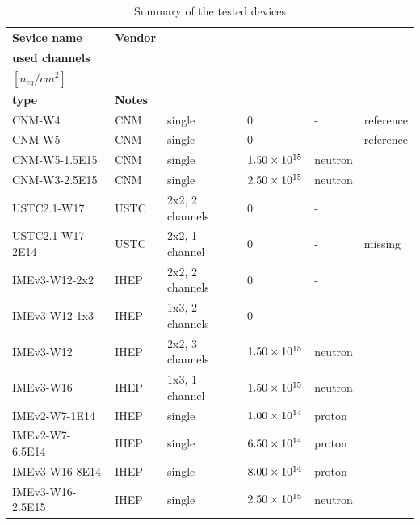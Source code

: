 \begin{table}[!ht]
    \centering
    \caption{Summary of the tested devices}
    \label{tab:devices_tested}
    \scriptsize
    \begin{tabularx}{1\textwidth}{|l|l|l|l|l|X|}
    \hline %
        \textbf{Sevice name} & \textbf{Vendor} & \begin{tabular}{@{}l@{}}\textbf{Pads,} \\ \textbf{used channels}\end{tabular} & \begin{tabular}{@{}l@{}}\textbf{Fluence} \\ $[n_{eq}/\si{cm^2}]$ \end{tabular} & \begin{tabular}{@{}l@{}} \textbf{Radiation} \\ \textbf{type} \end{tabular} & \textbf{Notes} \\
        \hline
        CNM-W4  & CNM & single & 0 & - & reference \\ 
        CNM-W5  & CNM & single & 0 & - & reference \\ 
        CNM-W5-1.5E15  & CNM & single & $\num{1.50E+15}$ & neutron &  \\ 
        CNM-W3-2.5E15  & CNM & single & $\num{2.50E+15}$ & neutron &  \\ 
        USTC2.1-W17 & USTC & 2x2, 2 channels  & 0 & - &  \\ 
        USTC2.1-W17-2E14 & USTC & 2x2, 1 channel & 0 & - & missing \\ 
        IMEv3-W12-2x2  & IHEP & 2x2, 2 channels  & 0 & - &  \\ 
        IMEv3-W12-1x3  & IHEP & 1x3, 2 channels  & 0 & - &  \\ 
        IMEv3-W12  & IHEP & 2x2, 3 channels  & $\num{1.50E+15}$ & neutron &  \\ 
        IMEv3-W16  & IHEP & 1x3, 1 channel  & $\num{1.50E+15}$ & neutron &  \\ 
        IMEv2-W7-1E14  & IHEP & single & $\num{1.00E+14}$ & proton &  \\ 
        IMEv2-W7-6.5E14  & IHEP & single & $\num{6.50E+14}$ & proton &  \\ 
        IMEv3-W16-8E14  & IHEP & single & $\num{8.00E+14}$ & proton &  \\
        IMEv3-W16-2.5E15  & IHEP & single & $\num{2.50E+15}$ & neutron &  \\ 
        \hline
    \end{tabularx}
\end{table}